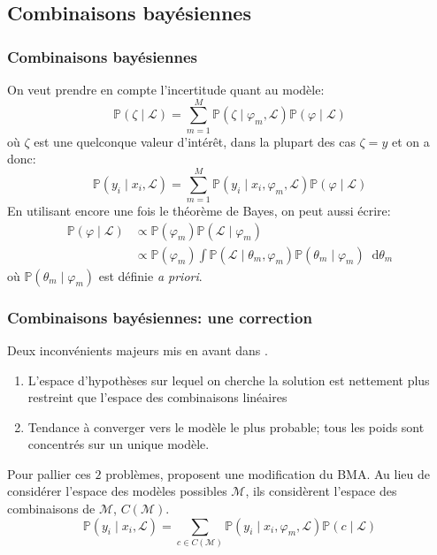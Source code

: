\documentclass[dvipsnames,10pt]{beamer}
\newcommand*\diff{\mathop{}\!\mathrm{d}}
\theoremstyle{plain}
\theoremstyle{definition}
\begin{document}
\subsection{Combinaisons bayésiennes}

\begin{frame}
\frametitle{Combinaisons bayésiennes}
On veut prendre en compte l'incertitude quant au  modèle:
\begin{equation}
    \mathbb{P} ( \zeta \mid \mathcal{L} ) = \sum_{m=1}^M \mathbb{P} (\zeta \mid \varphi_m , \mathcal{L}) \mathbb{P} ( \varphi \mid \mathcal{L} )
    \label{equ:bma}
\end{equation} 
où $\zeta$ est une quelconque valeur d'intérêt, dans la plupart des cas $\zeta = y$ et on a donc:
\begin{equation}
    \mathbb{P} ( y_i \mid x_i , \mathcal{L} ) = \sum_{m=1}^M \mathbb{P} (y_i \mid x_i,  \varphi_m , \mathcal{L}) \mathbb{P} ( \varphi \mid \mathcal{L} )
    \label{equ:bma2}
\end{equation} 
En utilisant encore une fois le théorème de Bayes, on peut aussi écrire:
\begin{align}
    \mathbb{P} ( \varphi \mid \mathcal{L} ) &\propto \mathbb{P} ( \varphi_m ) \mathbb{P} ( \mathcal{L} \mid \varphi_m ) \\
    &\propto \mathbb{P} ( \varphi_m ) \int \mathbb{P} ( \mathcal{L} \mid \theta_m , \varphi_m ) \mathbb{P} ( \theta_m \mid \varphi_m ) \diff \theta_m
    \label{equ:bayes}
\end{align}
où $\mathbb{P} ( \theta_m \mid \varphi_m )$ est définie \emph{a priori}.
\end{frame}

\begin{frame}
\frametitle{Combinaisons bayésiennes: une correction}
Deux inconvénients majeurs mis en avant dans \citet{Minka2002}.
\begin{enumerate}
    \item L'espace d'hypothèses sur lequel on cherche la solution est nettement plus restreint que l'espace des combinaisons linéaires
    \item Tendance à converger vers le modèle le plus probable; tous les poids sont concentrés sur un unique modèle.
\end{enumerate}
Pour pallier ces $2$ problèmes, \citet{Monteith2011b} proposent une modification du BMA. Au lieu de considérer l'espace des modèles possibles $\mathcal{M}$, ils considèrent l'espace des combinaisons de $\mathcal{M}$, $C ( \mathcal{M} )$.\begin{equation}
    \mathbb{P} ( y_i \mid x_i , \mathcal{L} ) = \sum_{c \in C ( \mathcal{M} )} \mathbb{P} (y_i \mid x_i,  \varphi_m , \mathcal{L}) \mathbb{P} ( c \mid \mathcal{L} )
    \label{equ:bmc}
\end{equation}
\end{frame}
\end{document}
